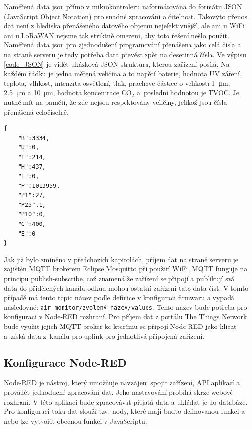 Naměřená data jsou přímo v mikrokontroleru naformátována do formátu JSON (JavaScript Object Notation) pro snadné zpracování a čitelnost. Takovýto přenos dat není z hlediska přenášeného datového objemu nejefektivnější, ale ani u WiFi ani u LoRaWAN nejsme tak striktně omezeni, aby toto řešení nešlo použít. Naměřená data jsou pro zjednodušení programování přenášena jako celá čísla a na straně serveru je tedy potřeba data převést zpět na desetinná čísla. Ve výpisu \ref{code_JSON} je vidět ukázková JSON struktura, kterou zařízení posílá. Na každém řádku je jedna měřená veličina a to napětí baterie, hodnota UV záření, teplota, vlhkost, intenzita osvětlení, tlak, prachové částice o velikosti \SI{1}{\micro\metre}, \SI{2.5}{\micro\metre} a \SI{10}{\micro\metre}, hodnota koncentrace CO$_2$ a~poslední hodnotou je TVOC. Je nutné mít na paměti, že zde nejsou respektovány veličiny, jelikož jsou čísla přenášená celočíselně.

\noindent
\begin{minipage}{\linewidth}
\begin{lstlisting}[caption={Příklad zasílané JSON zprávy.}, label={code_JSON}]
{
    "B":3334,
    "U":0,
    "T":214,
    "H":437,
    "L":0,
    "P":1013959,
    "P1":27,
    "P25":1,
    "P10":0,
    "C":400,
    "E":0
}
\end{lstlisting}
\end{minipage}

Jak již bylo zmíněno v předchozích kapitolách, příjem dat na straně serveru je zajištěn MQTT brokerem Eclipse Mosquitto při použití WiFi. MQTT funguje na principu publish-subscribe, což znamená že zařízení se připojí a publikují svá data do přidělených kanálů odkud mohou ostatní zařízení tato data číst. V tomto případě má tento topic název podle definice v konfiguraci firmwaru a vypadá následovně: \lstinline{air-monitor/zvolený_název/values}. Tento název bude potřeba pro konfiguraci v Node-RED rozhraní. Pro příjem dat z portálu The Things Network bude využit jejich MQTT broker ke kterému se připojí Node-RED jako klient a~získá data z~kanálu pro uplink pro jednotlivá připojená zařízení.

\subsection{Konfigurace Node-RED}

Node-RED je nástroj, který umožňuje navzájem spojit zařízení, API aplikací a provádět jednoduché zpracování dat. Jeho nastavování probíhá skrze webové rozhraní. V této aplikaci bude zpracovávat přijatá data a ukládat je do databáze. Pro konfiguraci toku dat slouží tzv. nody, které mají buďto definovanou funkci a nebo lze vytvořit obecnou funkci v JavaScriptu.

